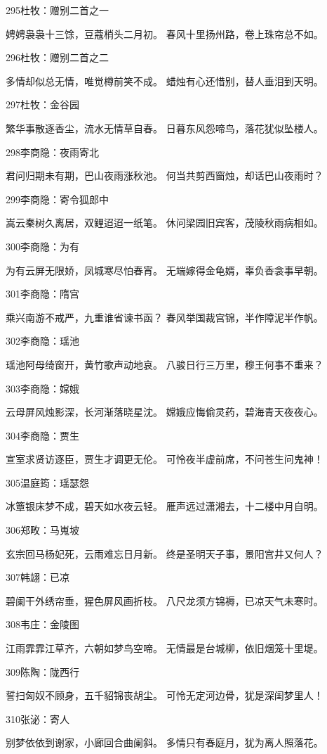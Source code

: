 295杜牧：赠别二首之一

娉娉袅袅十三馀，豆蔻梢头二月初。
春风十里扬州路，卷上珠帘总不如。

296杜牧：赠别二首之二

多情却似总无情，唯觉樽前笑不成。
蜡烛有心还惜别，替人垂泪到天明。

297杜牧：金谷园

繁华事散逐香尘，流水无情草自春。
日暮东风怨啼鸟，落花犹似坠楼人。

298李商隐：夜雨寄北

君问归期未有期，巴山夜雨涨秋池。
何当共剪西窗烛，却话巴山夜雨时？

299李商隐：寄令狐郎中

嵩云秦树久离居，双鲤迢迢一纸笔。
休问梁园旧宾客，茂陵秋雨病相如。

300李商隐：为有

为有云屏无限娇，凤城寒尽怕春宵。
无端嫁得金龟婿，辜负香衾事早朝。

301李商隐：隋宫

乘兴南游不戒严，九重谁省谏书函？
春风举国裁宫锦，半作障泥半作帆。

302李商隐：瑶池

瑶池阿母绮窗开，黄竹歌声动地哀。
八骏日行三万里，穆王何事不重来？

303李商隐：嫦娥

云母屏风烛影深，长河渐落晓星沈。
嫦娥应悔偷灵药，碧海青天夜夜心。

304李商隐：贾生

宣室求贤访逐臣，贾生才调更无伦。
可怜夜半虚前席，不问苍生问鬼神！

305温庭筠：瑶瑟怨

冰簟银床梦不成，碧天如水夜云轻。
雁声远过潇湘去，十二楼中月自明。

306郑畋：马嵬坡

玄宗回马杨妃死，云雨难忘日月新。
终是圣明天子事，景阳宫井又何人？

307韩翃：已凉

碧阑干外绣帘垂，猩色屏风画折枝。
八尺龙须方锦褥，已凉天气未寒时。

308韦庄：金陵图

江雨霏霏江草齐，六朝如梦鸟空啼。
无情最是台城柳，依旧烟笼十里堤。

309陈陶：陇西行

誓扫匈奴不顾身，五千貂锦丧胡尘。
可怜无定河边骨，犹是深闺梦里人！

310张泌：寄人

别梦依依到谢家，小廊回合曲阑斜。
多情只有春庭月，犹为离人照落花。

